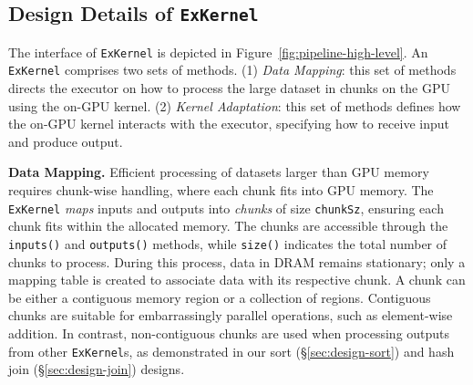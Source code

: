 \subsection{\textbf{Design Details of \texttt{ExKernel}}}
The interface of \texttt{ExKernel} is depicted in Figure~\ref{fig:pipeline-high-level}.
An \texttt{ExKernel} comprises two sets of methods.
(1) \textit{Data Mapping}: this set of methods directs the executor on how to process the large dataset in chunks on the GPU using the on-GPU kernel.
(2) \textit{Kernel Adaptation}: this set of methods defines how the on-GPU kernel interacts with the executor, specifying how to receive input and produce output.

\begin{comment}
The interface of \texttt{ExKernel} is shown in Figure~\ref{fig:pipeline-high-level}.
An \texttt{ExKernel} includes two sets of methods. 
One set of methods, \textit{Data Mapping}, tells the executor how to process the large data piece by piece on GPU using the on-GPU kernel, while another, \textit{Kernel Adaption}, specifies how the on-GPU kernel should get input from and dump output to the executor.
\end{comment}


\noindent
\textbf{Data Mapping.}
Efficient processing of datasets larger than GPU memory requires chunk-wise handling, where each chunk fits into GPU memory. 
The \texttt{ExKernel} \textit{maps} inputs and outputs into \textit{chunks} of size \texttt{chunkSz}, ensuring each chunk fits within the allocated memory. 
The chunks are accessible through the \texttt{inputs()} and \texttt{outputs()} methods, while \texttt{size()} indicates the total number of chunks to process. 
During this process, data in DRAM remains stationary; only a mapping table is created to associate data with its respective chunk. 
A chunk can be either a contiguous memory region or a collection of regions. 
Contiguous chunks are suitable for embarrassingly parallel operations, such as element-wise addition. 
In contrast, non-contiguous chunks are used when processing outputs from other \texttt{ExKernel}s, as demonstrated in our sort (\S\ref{sec:design-sort}) and hash join (\S\ref{sec:design-join}) designs.

